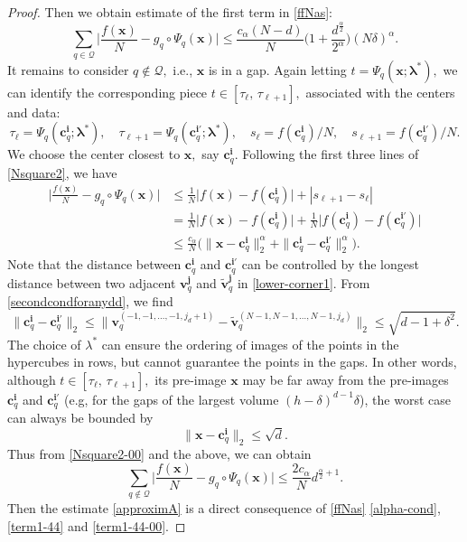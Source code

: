 \documentclass[10pt,reqno,final]{amsart}
\theoremstyle{remark}
\theoremstyle{definition}
\newcommand{\bs}[1]{\boldsymbol{#1}}
\begin{document}
\begin{proof}
Then we obtain estimate of the first term in \eqref{ffNas}:
\begin{equation}\label{term1-44}
    \sum_{q\in {\mathcal Q}}\Big|\frac{f(\bs x)}{N}-g_q\circ\Psi_q(\bs x)\Big| \le \frac{c_{\alpha}(N-d)}{N}  \Big(1+\frac{d^{\frac{\alpha}{2}}} {2^{\alpha}}\Big)(N\delta)^{\alpha}.
\end{equation}
It remains to consider  $q\notin {\mathcal Q},$ i.e.,
$\bs x$ is in a gap. Again letting  
$t=\Psi_q(\bs{x};\bs \lambda^*),$ 
we can identify the corresponding piece $t\in [\tau_\ell,\,  \tau_{\ell+1}],$ associated with the centers and data:
$$
\tau_\ell= \Psi_q(\bs{c}_q^{\bs i};\bs \lambda^*),\quad  \tau_{\ell+1}= \Psi_q(\bs{c}_q^{\bs i'};\bs \lambda^*), \quad  s_\ell= f(\bs{c}_q^{\bs i})/N,\quad  s_{\ell+1}= f(\bs{c}_q^{\bs i'})/N.
$$
We choose the center closest to $\bs x,$ say $\bs{c}_q^{\bs i}.$ Following the first three lines of \eqref{Nsquare2}, we have 
\begin{equation}\label{Nsquare2-00}
\begin{split}
\Big|\frac{f(\bs{x})}{N}  -g_q\circ\Psi_q(\bs{x})\Big| & 
\le \frac 1 N \big|{f(\bs{x})}-   {f(\bs{c}_q^{\bs{i}})} \big|+|s_{\ell+1}-s_\ell|\\[4pt] 
& =\frac 1 N \big|{f(\bs{x})}-   {f(\bs{c}_q^{\bs{i}})} \big|+\frac 1 N \big|f(\bs{c}_q^{\bs i})-   f(\bs{c}_q^{\bs{i'}}) \big|\\[4pt]
&\le \frac{c_{\alpha}} N \big(\|\bs x- 
\bs{c}_q^{\bs{i}}\|_2^\alpha +
\|\bs{c}_q^{\bs{i}}-\bs{c}_q^{\bs{i'}}\|_2^\alpha\big).
\end{split}
\end{equation}
Note that the distance between $\bs{c}_q^{\bs{i}}$ and $\bs{c}_q^{\bs{i'}}$ can be controlled by the longest distance between two adjacent $\bs v_q^{\bs j}$ and 
$\tilde {\bs v}_q^{\bs j}$ in 
\eqref{lower-corner1}. From \eqref{secondcondforanydd}, we find  
\begin{equation}\label{cqi-est}
\|\bs{c}_q^{\bs{i}}-\bs{c}_q^{\bs{i'}}\|_2
\le \| \bs v_q^{(-1,-1,\ldots,-1,j_d+1)}-\tilde {\bs v}_q^{(N-1,N-1,\ldots,N-1,j_d)} \|_2
\le \sqrt{d-1+\delta^2}.
\end{equation}
The choice of $\lambda^*$ can ensure the ordering of images of the points in the hypercubes in rows, but cannot guarantee the points in the gaps. In other words, although $t\in [\tau_\ell,\,  \tau_{\ell+1}],$  its pre-image $\bs x$ may be far away from the pre-images $\bs{c}_q^{\bs{i}}$ and $\bs{c}_q^{\bs{i'}}$ (e.g, for the gaps of the largest volume  $(h-\delta)^{d-1}\delta$), the worst case can always be bounded by 
\begin{equation}\label{cqi-est2}
\|\bs x- 
\bs{c}_q^{\bs{i}}\|_2\le \sqrt d.
\end{equation}
Thus from  \eqref{Nsquare2-00} and the above,  we can obtain  
\begin{equation}\label{term1-44-00}
    \sum_{q\not \in {\mathcal Q}}\Big|\frac{f(\bs x)}{N}-g_q\circ\Psi_q(\bs x)\Big| \le  \frac{2c_{\alpha}}{N} d^{\frac \alpha 2+1}.  
\end{equation}
Then the estimate \eqref{approximA} is a direct consequence of  \eqref{ffNas}
\eqref{alpha-cond}, \eqref{term1-44} and \eqref{term1-44-00}. 
\end{proof}
\end{document}
